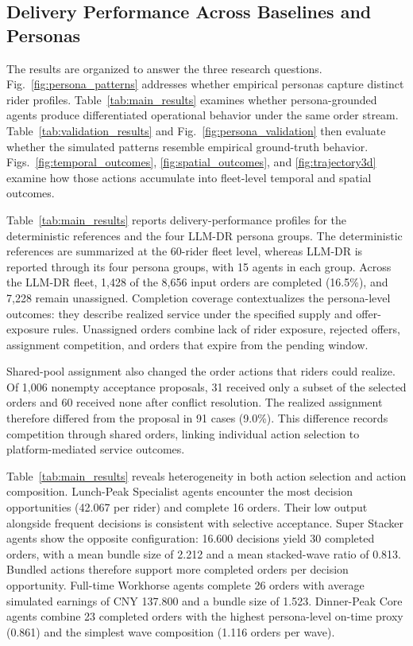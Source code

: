 \documentclass[letterpaper,journal]{IEEEtran}
\begin{document}
\subsection{Delivery Performance Across Baselines and Personas}
The results are organized to answer the three research questions. Fig.~\ref{fig:persona_patterns} addresses whether empirical personas capture distinct rider profiles. Table~\ref{tab:main_results} examines whether persona-grounded agents produce differentiated operational behavior under the same order stream. Table~\ref{tab:validation_results} and Fig.~\ref{fig:persona_validation} then evaluate whether the simulated patterns resemble empirical ground-truth behavior. Figs.~\ref{fig:temporal_outcomes}, \ref{fig:spatial_outcomes}, and \ref{fig:trajectory3d} examine how those actions accumulate into fleet-level temporal and spatial outcomes.

Table~\ref{tab:main_results} reports delivery-performance profiles for the deterministic references and the four LLM-DR persona groups. The deterministic references are summarized at the 60-rider fleet level, whereas LLM-DR is reported through its four persona groups, with 15 agents in each group. Across the LLM-DR fleet, 1,428 of the 8,656 input orders are completed (16.5\%), and 7,228 remain unassigned. Completion coverage contextualizes the persona-level outcomes: they describe realized service under the specified supply and offer-exposure rules. Unassigned orders combine lack of rider exposure, rejected offers, assignment competition, and orders that expire from the pending window.

Shared-pool assignment also changed the order actions that riders could realize. Of 1,006 nonempty acceptance proposals, 31 received only a subset of the selected orders and 60 received none after conflict resolution. The realized assignment therefore differed from the proposal in 91 cases (9.0\%). This difference records competition through shared orders, linking individual action selection to platform-mediated service outcomes.

Table~\ref{tab:main_results} reveals heterogeneity in both action selection and action composition. Lunch-Peak Specialist agents encounter the most decision opportunities (42.067 per rider) and complete 16 orders. Their low output alongside frequent decisions is consistent with selective acceptance. Super Stacker agents show the opposite configuration: 16.600 decisions yield 30 completed orders, with a mean bundle size of 2.212 and a mean stacked-wave ratio of 0.813. Bundled actions therefore support more completed orders per decision opportunity. Full-time Workhorse agents complete 26 orders with average simulated earnings of CNY 137.800 and a bundle size of 1.523. Dinner-Peak Core agents combine 23 completed orders with the highest persona-level on-time proxy (0.861) and the simplest wave composition (1.116 orders per wave).
\end{document}
